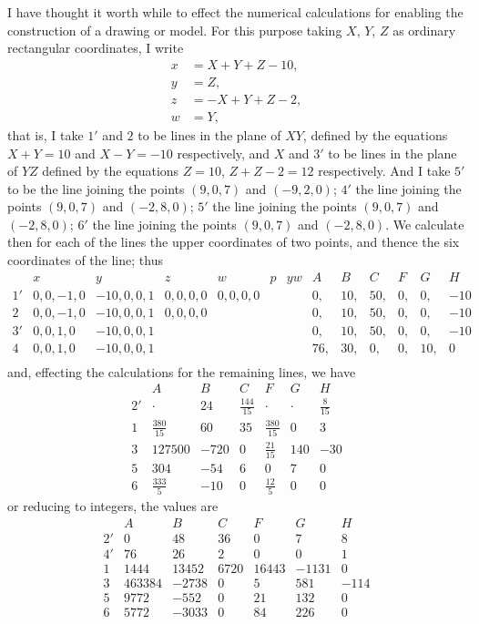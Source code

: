 \documentclass[11pt,a4paper]{article}
\begin{document}
\medskip

I have thought it worth while to effect the numerical calculations for
enabling the construction of a drawing or model. For this purpose taking
$X$, $Y$, $Z$ as ordinary rectangular coordinates, I write
\[
\begin{aligned}
x &= X + Y + Z - 10,\\
y &= Z,\\
z &= -X + Y + Z - 2,\\
w &= Y,
\end{aligned}
\]
that is, I take $1'$ and $2$ to be lines in the plane of $XY$, defined
by the equations $X + Y = 10$ and $X - Y = -10$ respectively, and $X$ and
$3'$ to be lines in the plane of $YZ$ defined by the equations $Z = 10$,
$Z + Z - 2 = 12$ respectively. And I take $5'$ to be the line joining the
points $(9, 0, 7)$ and $(-9, 2, 0)$; $4'$ the line joining the points
$(9, 0, 7)$ and $(-2, 8, 0)$; $5'$ the line joining the points
$(9, 0, 7)$ and $(-2, 8, 0)$; $6'$ the line joining the points
$(9, 0, 7)$ and $(-2, 8, 0)$. We calculate then for each of the lines the
upper coordinates of two points, and thence the six coordinates of the
line; thus
\[
\renewcommand{\arraystretch}{1.2}
\begin{array}{c|cccccc|cccccc}
   & x & y & z & w & p & y w & A & B & C & F & G & H \\\hline
1' & 0, 0, -1, 0 & -10, 0, 0, 1 & 0, 0, 0, 0 & 0, 0, 0, 0 & & & 0, & 10, & 50, & 0, & 0, & -10 \\
2  & 0, 0, -1, 0 & -10, 0, 0, 1 & 0, 0, 0, 0 & & & & 0, & 10, & 50, & 0, & 0, & -10 \\
3' & 0, 0, 1, 0 & -10, 0, 0, 1 & & & & & 0, & 10, & 50, & 0, & 0, & -10 \\
4  & 0, 0, 1, 0 & -10, 0, 0, 1 & & & & & 76, & 30, & 0, & 0, & 10, & 0 \\
\end{array}
\]
and, effecting the calculations for the remaining lines, we have
\[
\begin{array}{c|cccccc}
   & A & B & C & F & G & H \\\hline
2' & \cdot & 24 & \tfrac{144}{15} & \cdot & \cdot & \tfrac{8}{15} \\
1 & \tfrac{380}{15} & 60 & 35 & \tfrac{380}{15} & 0 & 3 \\
3 & 127500 & -720 & 0 & \tfrac{21}{15} & 140 & -30 \\
5 & 304 & -54 & 6 & 0 & 7 & 0 \\
6 & \tfrac{333}{5} & -10 & 0 & \tfrac{12}{5} & 0 & 0
\end{array}
\]
or reducing to integers, the values are
\[
\begin{array}{c|cccccc}
   & A & B & C & F & G & H \\\hline
2' & 0 & 48 & 36 & 0 & 7 & 8 \\
4' & 76 & 26 & 2 & 0 & 0 & 1 \\
1 & 1444 & 13452 & 6720 & 16443 & -1131 & 0 \\
3 & 463384 & -2738 & 0 & 5 & 581 & -114 \\
5 & 9772 & -552 & 0 & 21 & 132 & 0 \\
6 & 5772 & -3033 & 0 & 84 & 226 & 0
\end{array}
\]
\end{document}
